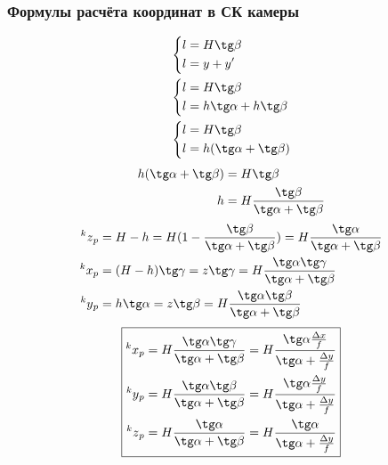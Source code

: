 \documentclass[a4paper, 12pt]{article}
\begin{document}
			\subsubsection{Формулы расчёта координат в СК камеры}
				\begin{equation*}
					\begin{split}
						&\left\{
							\begin{aligned}
								l &= H \tg \beta \\
								l &= y + y'\\
							\end{aligned}
						\right.\\
						&\left\{
							\begin{aligned}
								l &= H \tg \beta \\
								l &= h \tg \alpha + h\tg\beta\\
							\end{aligned}
						\right.\\
						&\left\{
							\begin{aligned}
								l &= H \tg \beta \\
								l &= h(\tg\alpha+\tg\beta)\\
							\end{aligned}
						\right.\\
					\end{split}
				\end{equation*}
				\begin{equation*}
					\begin{split}
						h(\tg\alpha+\tg\beta)&=H\tg\beta\\
						h &= H\dfrac{\tg\beta}{\tg\alpha+\tg\beta}\\
					\end{split}
				\end{equation*}
				\begin{equation*}
					\begin{split}
						\prescript{k}{}{z}_p &= H-h = H(1-\frac{\tg\beta}{\tg\alpha+\tg\beta}) = H\dfrac{\tg\alpha}{\tg\alpha+\tg\beta}\\
						\prescript{k}{}{x}_p &= (H-h)\tg\gamma = z\tg\gamma = H\dfrac{\tg\alpha\tg\gamma}{\tg\alpha+\tg\beta}\\
						\prescript{k}{}{y}_p &= h\tg\alpha = z\tg\beta = H\dfrac{\tg\alpha\tg\beta}{\tg\alpha+\tg\beta}
					\end{split}
				\end{equation*}
				\begin{equation*}\label{eq:camcoord}
					\boxed{
						\begin{aligned}
							\prescript{k}{}{x}_p = H\frac{\tg\alpha\tg\gamma}{\tg\alpha+\tg\beta} = H\frac{\tg\alpha\frac{\Delta x}{f}}{\tg\alpha+\frac{\Delta y}{f}}\\
							\prescript{k}{}{y}_p = H\frac{\tg\alpha\tg\beta}{\tg\alpha+\tg\beta} = H\frac{\tg\alpha\frac{\Delta y}{f}}{\tg\alpha+\frac{\Delta y}{f}}\\
							\prescript{k}{}{z}_p = H\frac{\tg\alpha}{\tg\alpha+\tg\beta} = H\frac{\tg\alpha}{\tg\alpha+\frac{\Delta y}{f}}
						\end{aligned}
					}
				\end{equation*}
\end{document}
